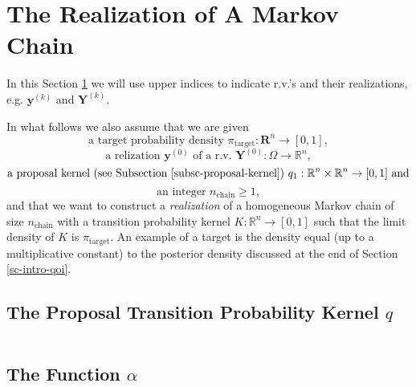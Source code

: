 \section{The Realization of A Markov Chain}\label{sc-mcmc-realization-of-a-markov-chain}

In this Section \ref{sc-mcmc-realization-of-a-markov-chain}
we will use upper indices to indicate r.v.'s and their realizations, e.g. $\mathbf{y}^{(k)}$ and $\mathbf{Y}^{(k)}$.

In what follows we also assume that
we are given
\begin{equation}\label{eq-pi-target}
\mbox{a target probability density }\pi_{\mbox{target}}:\mathbf{R}^n\rightarrow [0,1],
\end{equation}
\begin{equation}\label{eq-y0}
\mbox{a relization }\mathbf{y}^{(0)}\mbox{ of a r.v. }\mathbf{Y}^{(0)}:\Omega\rightarrow\mathbb{R}^n,
\end{equation}
\begin{equation}\label{eq-q1}
\mbox{a proposal kernel (see Subsection \ref{subsc-proposal-kernel}) }q_1:\mathbb{R}^n\times \mathbb{R}^n\rightarrow [0,1]\mbox{ and}
\end{equation}
\begin{equation}\label{eq-n-chain}
\mbox{an integer }n_{\mbox{chain}}\geqslant 1,
\end{equation}
and that
we want to construct a {\it realization} of
a homogeneous Markov chain of size $n_{\mbox{chain}}$ with a transition probability kernel $K:\mathbb{R}^n\rightarrow [0,1]$
such that the limit density of $K$ is $\pi_{\mbox{target}}$.
An example of a target is the density equal (up to a multiplicative constant) to the posterior density discussed
at the end of Section \ref{sc-intro-qoi}.

\subsection{The Proposal Transition Probability Kernel $q$}\label{subsc-proposal-kernel}
$~$\\

\subsection{The Function $\alpha$}

